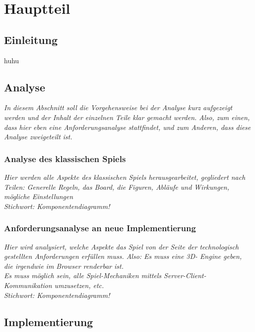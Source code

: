 \chapter{Hauptteil}
\label{cha:Hauptteil}

\section{Einleitung}

huhu
\section{Analyse}
\label{sec:analyse}

\emph{In diesem Abschnitt soll die Vorgehensweise bei der Analyse kurz aufgezeigt werden und der Inhalt der einzelnen Teile klar gemacht werden. Also, zum einen, dass hier eben eine Anforderungsanalyse stattfindet, und zum Anderen, dass diese Analyse zweigeteilt ist.}

\subsection{Analyse des klassischen Spiels}
\label{subsec:spiel_analyse}

\emph{Hier werden alle Aspekte des klassischen Spiels herausgearbeitet, gegliedert nach Teilen: Generelle Regeln, das Board, die Figuren, Abläufe und Wirkungen, mögliche Einstellungen\\Stichwort: Komponentendiagramm!}

\subsection{Anforderungsanalyse an neue Implementierung}
\label{subsec:neueImpl_analyse}

\emph{Hier wird analysiert, welche Aspekte das Spiel von der Seite der technologisch gestellten Anforderungen erfüllen muss. Also: Es muss eine 3D- Engine geben, die irgendwie im Browser renderbar ist.\\ Es muss möglich sein, alle Spiel-Mechaniken mittels Server-Client-Kommunikation umzusetzen, etc.\\Stichwort: Komponentendiagramm!}

\section{Implementierung}
\label{sec:Umsetzung}

